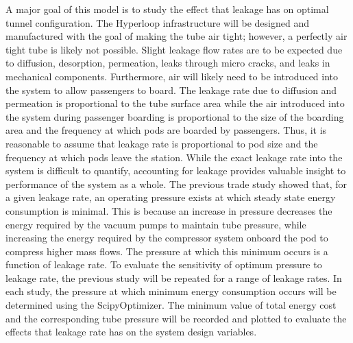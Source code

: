 A major goal of this model is to study the effect that leakage has on optimal
tunnel configuration. The Hyperloop infrastructure will be designed and
manufactured with the goal of making the tube air tight; however, a perfectly
air tight tube is likely not possible. Slight leakage flow rates are to be
expected due to diffusion, desorption, permeation, leaks through micro cracks,
and leaks in mechanical components. Furthermore, air will likely need to be
introduced into the system to allow passengers to board. The leakage rate due to
diffusion and permeation is proportional to the tube surface area while the air
introduced into the system during passenger boarding is proportional to the
size of the boarding area and the frequency at which pods are boarded by passengers.
Thus, it is reasonable to assume that leakage rate is proportional to pod size
and the frequency at which pods leave the station. While the exact leakage rate
into the system is difficult to quantify, accounting for leakage provides
valuable insight to performance of the system as a whole.
The previous trade study showed that, for a given leakage rate, an operating
pressure exists at which steady state energy consumption is minimal.
This is because an increase in pressure decreases the energy required by the
vacuum pumps to maintain tube pressure, while increasing the energy required by
the compressor system onboard the pod to compress higher mass flows.
The pressure at which this minimum occurs is a function of leakage rate.
To evaluate the sensitivity of optimum pressure to leakage rate, the previous
study will be repeated for a range of leakage rates. In each study, the
pressure at which minimum energy consumption occurs will be determined using
the ScipyOptimizer. The minimum value of total energy cost and the
corresponding tube pressure will be recorded and plotted to evaluate the
effects that leakage rate has on the system design variables.


